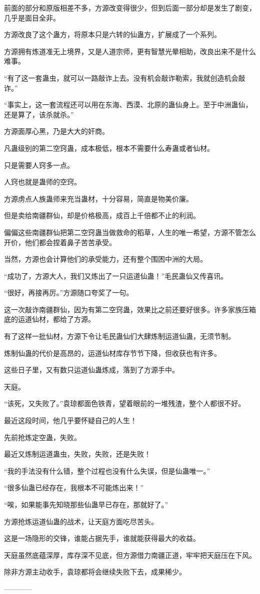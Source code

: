 \begin{this_body}
前面的部分和原版相差不多，方源改变得很少，但到后面一部分却是发生了剧变，几乎是面目全非。

方源改良了这个蛊方，将原本只是六转的仙蛊方，扩展成了一个系列。

方源拥有炼道准无上境界，又是人道宗师，更有智慧光晕相助，改良出来不是什么难事。

“有了这一套蛊虫，就可以一路敲诈上去。没有机会敲诈勒索，我就创造机会敲诈。”

“事实上，这一套流程还可以用在东海、西漠、北原的蛊仙身上。至于中洲蛊仙，还是算了，该杀就杀。”

方源面厚心黑，乃是大大的奸商。

凡蛊级别的第二空窍蛊，成本极低，根本不需要什么寿蛊或者仙材。

只是需要人窍多一点。

人窍也就是蛊师的空窍。

方源虏点人族蛊师来充当蛊材，十分容易，简直是物美价廉。

但是卖给南疆群仙，却是价格极高，成百上千倍都不止的利润。

偏偏这些南疆群仙把第二空窍蛊当做救命的稻草，人生的唯一希望，方源不管怎么开价，他们都会捏着鼻子苦苦承受。

当然，方源也会计算他们的承受能力，还有整个围困中洲的大局。

“成功了，方源大人，我们又炼出了一只运道仙蛊！”毛民蛊仙又传喜讯。

“很好，再接再厉。”方源随口夸奖了一句。

这一次敲诈南疆群仙，因为有第二空窍蛊，效果比之前还要好很多。许多家族压箱底的运道仙材，都给了方源。

有了这样一批仙材，方源下令让毛民蛊仙们大肆炼制运道仙蛊，无须节制。

炼制仙蛊的代价是高昂的，运道仙材库存节节下降，但收获也有许多。

这些日子里，又有数只运道仙蛊炼成，落到了方源手中。

天庭。

“该死，又失败了。”袁琼都面色铁青，望着眼前的一堆残渣，整个人都很不好。

最近这段时间，他几乎要怀疑自己的人生！

先前抢炼定空蛊，失败。

最近又炼制运道蛊虫，失败，失败，还是失败！

“我的手法没有什么错，整个过程也没有什么失误，但是仙蛊唯一。”

“很多仙蛊已经存在，我根本不可能炼出来！”

“唉，如果能事先知晓那些仙蛊早已存在，那就好了。”

方源抢炼运道仙蛊的战术，让天庭方面吃尽苦头。

这是一场隐形的交锋，谁能占据先手，谁就能获得最大的收益。

天庭虽然底蕴深厚，库存深不见底，但方源借力南疆正道，牢牢把天庭压在下风。

除非方源主动收手，袁琼都将会继续失败下去，成果稀少。

------------

\end{this_body}

